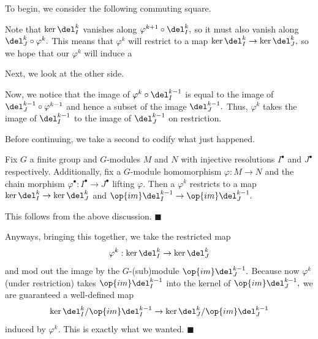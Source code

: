 To begin, we consider the following commuting square.
\begin{center}
\end{center}
Note that $\ker\del_I^k$ vanishes along $\varphi^{k+1}\circ\del_I^k,$ so it must also vanish along $\del_J^k\circ\varphi^k.$ This means that $\varphi^k$ will restrict to a map $\ker\del_I^k\to\ker\del_J^k,$ so we hope that our $\varphi^k$ will induce a 

Next, we look at the other side.
\begin{center}
\end{center}
Now, we notice that the image of $\varphi^k\circ\del_I^{k-1}$ is equal to the image of $\del_J^{k-1}\circ\varphi^{k-1}$ and hence a subset of the image $\del_J^{k-1}.$ Thus, $\varphi^k$ takes the image of $\del_I^{k-1}$ to the image of $\del_J^{k-1}$ on restriction.

Before continuing, we take a second to codify what just happened.
\begin{lemma}
    Fix $G$ a finite group and $G$-modules $M$ and $N$ with injective resolutions $I^\bullet$ and $J^\bullet$ respectively. Additionally, fix a $G$-module homomorphism $\varphi:M\to N$ and the chain morphism $\varphi^\bullet:I^\bullet\to J^\bullet$ lifting $\varphi.$ Then a $\varphi^k$ restricts to a map $\ker\del_I^k\to\ker\del_J^k$ and $\op{im}\del_I^{k-1}\to\op{im}\del_J^{k-1}.$
\end{lemma}
This follows from the above discussion. $\blacksquare$

Anyways, bringing this together, we take the restricted map
\[\varphi^k:\ker\del_I^k\to\ker\del_J^k\]
and mod out the image by the $G$-(sub)module $\op{im}\del_J^{k-1}.$ Because now $\varphi^k$ (under restriction) takes $\op{im}\del_I^{k-1}$ into the kernel of $\op{im}\del_J^{k-1},$ we are guaranteed a well-defined map
\[\ker\del_I^k/\op{im}\del_I^{k-1}\to\ker\del_J^k/\op{im}\del_J^{k-1}\]
induced by $\varphi^k.$ This is exactly what we wanted. $\blacksquare$

